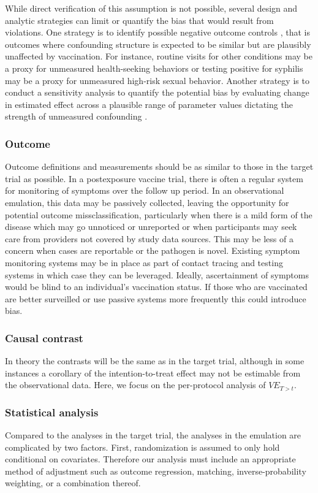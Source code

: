\documentclass[11pt]{article}
\begin{document}
While direct verification of this assumption is not possible, several design and analytic strategies can limit or quantify the bias that would result from violations. One strategy is to identify possible negative outcome controls \cite{chua_use_2020,lipsitch_negative_2010-1}, that is outcomes where confounding structure is expected to be similar but are plausibly unaffected by vaccination. For instance, routine visits for other conditions may be a proxy for unmeasured health-seeking behaviors or testing positive for syphilis may be a proxy for unmeasured high-risk sexual behavior.  Another strategy is to conduct a sensitivity analysis to quantify the potential bias by evaluating change in estimated effect across a plausible range of parameter values dictating the strength of unmeasured confounding \cite{robins_sensitivity_2000}. 

\subsubsection*{Outcome}
Outcome definitions and measurements should be as similar to those in the target trial as possible. In a postexposure vaccine trial, there is often a regular system for monitoring of symptoms over the follow up period. In an observational emulation, this data may be passively collected, leaving the opportunity for potential outcome missclassification, particularly when there is a mild form of the disease which may go unnoticed or unreported or when participants may seek care from providers not covered by study data sources. This may be less of a concern when cases are reportable or the pathogen is novel. Existing symptom monitoring systems may be in place as part of contact tracing and testing systems in which case they can be leveraged. Ideally, ascertainment of symptoms would be blind to an individual's vaccination status. If those who are vaccinated are better surveilled or use passive systems more frequently this could introduce bias. 

\subsubsection*{Causal contrast}
In theory the contrasts will be the same as in the target trial, although in some instances a corollary of the intention-to-treat effect may not be estimable from the observational data. Here, we focus on the per-protocol \cite{hernan_per-protocol_2017} analysis of $VE_{T > t}$.

\subsubsection*{Statistical analysis}
Compared to the analyses in the target trial, the analyses in the emulation are complicated by two factors. First, randomization is assumed to only hold conditional on covariates. Therefore our analysis must include an appropriate method of adjustment such as outcome regression, matching, inverse-probability weighting, or a combination thereof. 
\end{document}
